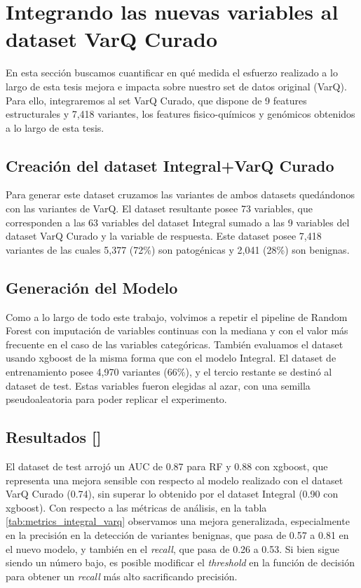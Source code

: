 \section{Integrando las nuevas variables al dataset VarQ Curado}

En esta sección buscamos cuantificar en qué medida el esfuerzo realizado a lo largo de esta tesis mejora e impacta sobre nuestro set de datos original (VarQ). Para ello, integraremos al set VarQ Curado, que dispone de 9 features estructurales y 7,418 variantes, los features fisico-químicos y genómicos obtenidos a lo largo de esta tesis.

\subsection{Creación del dataset Integral+VarQ Curado}
Para generar este dataset cruzamos las variantes de ambos datasets quedándonos con las variantes de VarQ. El dataset resultante posee 73 variables, que corresponden a las 63 variables del dataset Integral sumado a las 9 variables del dataset VarQ Curado y la variable de respuesta. Este dataset posee 7,418 variantes de las cuales 5,377 (72\%) son patogénicas y 2,041 (28\%) son benignas. 

\subsection{Generación del Modelo}
Como a lo largo de todo este trabajo, volvimos a repetir el pipeline de Random Forest con imputación de variables continuas con la mediana y con el valor más frecuente en el caso de las variables categóricas. También evaluamos el dataset usando xgboost de la misma forma que con el modelo Integral. El dataset de entrenamiento posee 4,970 variantes (66\%), y el tercio restante se destinó al dataset de test. Estas variables fueron elegidas al azar, con una semilla pseudoaleatoria para poder replicar el experimento.  

\subsection{Resultados  []}
El dataset de test arrojó un AUC de 0.87 para RF y 0.88 con xgboost, que representa una mejora sensible con respecto al modelo realizado con el dataset VarQ Curado (0.74), sin superar lo obtenido por el dataset Integral (0.90 con xgboost). Con respecto a las métricas de análisis, en la tabla \ref{tab:metrics_integral_varq} observamos una mejora generalizada, especialmente en la precisión en la detección de variantes benignas, que pasa de 0.57 a 0.81 en el nuevo modelo, y también en el \textit{recall}, que pasa de 0.26 a 0.53. Si bien sigue siendo un número bajo, es posible modificar el \textit{threshold} en la función de decisión para obtener un \textit{recall} más alto sacrificando precisión. 

